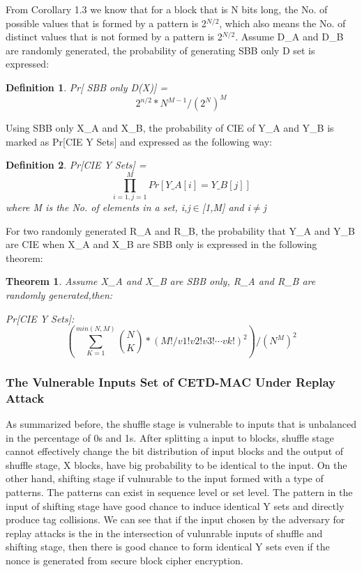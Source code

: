 \documentclass{article}
\newtheorem{theorem}{Theorem}[section]
\newtheorem{defination}{Definition}[section]
\begin{document}
From Corollary 1.3 we know that for a block that is N bits long, the No. of possible values that is formed by a pattern is 2$^{N/2}$, which also means the No. of distinct values that is not formed by a pattern is 2$^{N/2}$. Assume D\_A and D\_B are randomly generated, the probability of generating SBB only D set is expressed:
\begin{defination}
Pr[ SBB only D(X)] =
\begin{equation}
2^{n/2} * N^{M-1} / (2^N)^M
\end{equation}
\end{defination} 

Using SBB only X\_A and X\_B, the probability of CIE of Y\_A and Y\_B is marked as Pr[CIE Y Sets] and expressed as the following way:
\begin{defination}
Pr[CIE Y Sets] = $$\prod_{i=1,j=1}^M Pr[Y\_A[i] = Y\_B[j]]$$ where M is the No. of elements in a set, i,j$\in$[1,M] and i$\neq$j
\end{defination} 

For two randomly generated R\_A and R\_B, the probability that Y\_A and Y\_B are CIE when X\_A and X\_B are SBB only is expressed in the following theorem:
\begin{theorem}
Assume X\_A and X\_B are SBB only, R\_A and R\_B are randomly generated,then:

Pr[CIE Y Sets]:
\begin{displaymath}
(\sum_{K=1}^{min(N,M)} \binom{N}{K} * (M!/v1!v2!v3! \cdots vk!) ^ 2 )/(N^M)^2
\end{displaymath}
\label{set-prob}
\end{theorem}

\subsubsection{The Vulnerable Inputs Set of CETD-MAC Under Replay Attack}
As summarized before, the shuffle stage is vulnerable to inputs that is unbalanced in the percentage of 0s and 1s. After splitting a input to blocks, shuffle stage cannot effectively change the bit distribution of input blocks and the output of shuffle stage, X blocks, have big probability to be identical to the input.
On the other hand, shifting stage if vulnurable to the input formed with a type of patterns. The patterns can exist in sequence level or set level. The pattern in the input of shifting stage have good chance to induce identical Y sets and directly produce tag collisions. 
We can see that if the input chosen by the adversary for replay attacks is the in the intersection of vulunrable inputs of shuffle and shifting stage, then there is good chance to form identical Y sets even if the nonce is generated from secure block cipher encryption. 
\end{document}
